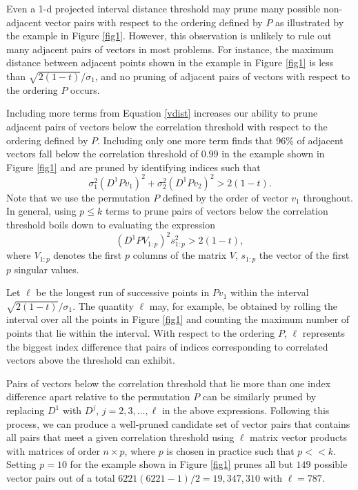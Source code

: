 \documentclass{article}
\numberwithin{algorithmctr}{section}
\begin{document}
Even a 1-d projected interval distance threshold may prune many possible
non-adjacent vector pairs with respect to the ordering defined by $P$ as
illustrated by the example in Figure \ref{fig1}.  However, this observation is
unlikely to rule out many adjacent pairs of vectors in most problems.  For
instance, the maximum distance between adjacent points shown in the example in
Figure \ref{fig1} is less than $\sqrt{2(1-t)}/\sigma_1$, and no pruning of
adjacent pairs of vectors with respect to the ordering $P$ occurs.

Including more terms from Equation \ref{vdist} increases our ability to prune
adjacent pairs of vectors below the correlation threshold with respect to the
ordering defined by $P$.  Including only one more term finds that 96\% of
adjacent vectors fall below the correlation threshold of $0.99$ in the
example shown in Figure \ref{fig1} and are pruned by identifying indices such
that
\[
\sigma_1^2 (D^1 P v_1)^2 +
\sigma_2^2 (D^1 P v_2)^2 > 2(1-t).
\]
Note that we use the permutation $P$ defined by the order of vector $v_1$
throughout.  In general, using $p\le k$ terms to prune pairs of vectors
below the correlation threshold boils down to evaluating the expression
\begin{equation}\label{proj}
(D^1 P V_{1:p} )^2 s_{1:p}^2 > 2(1-t),
\end{equation}
where 
$V_{1:p}$ denotes the first $p$ columns of the
matrix $V$, $s_{1:p}$ the vector of the first $p$ singular values.

Let $\ell$ be the longest run of successive points in $P v_1$ within the
interval $\sqrt{2(1-t)}/\sigma_1$.  The quantity $\ell$ may, for example, be
obtained by rolling the interval over all the points in Figure \ref{fig1} and
counting the maximum number of points that lie within the interval.  With
respect to the ordering $P$, $\ell$ represents the biggest index difference
that pairs of indices corresponding to correlated vectors above the threshold
can exhibit.

Pairs of vectors below the correlation threshold that lie more than one index
difference apart relative to the permutation $P$ can be similarly pruned by
replacing $D^1$ with $D^j$, $j=2,3,\ldots,\ell$ in the above expressions.
Following this process, we can produce a well-pruned candidate set of vector
pairs that contains all pairs that meet a given correlation threshold using
$\ell$ matrix vector products with matrices of order $n \times p$, where $p$ is
chosen in practice such that $p<<k$. Setting $p=10$ for the example shown in
Figure \ref{fig1} prunes all but $149$ possible vector pairs out of a total
$6221(6221 - 1)/2 = 19,347,310$ with $\ell=787$.
\end{document}
